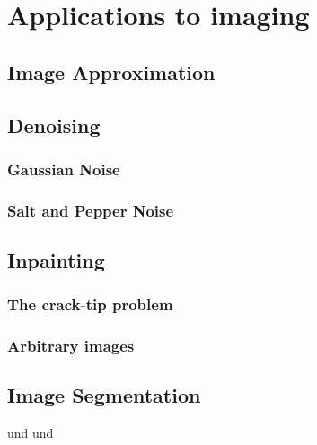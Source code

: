 \chapter{Applications to imaging} %
\label{cha:applications_to_imaging}

    \section{Image Approximation} %
    \label{sec:image_approximation}
    

    \section{Denoising} %
    \label{sec:denoising}
        \subsection{Gaussian Noise} %
        \label{sub:gaussian_noise}
            

        \subsection{Salt and Pepper Noise} %
        \label{sub:salt_and_pepper_noise}
            

    \section{Inpainting} %
    \label{sec:inpainting}
        \subsection{The crack-tip problem} %
        \label{sub:the_crack_tip_problem}
            
        \subsection{Arbitrary images} %
        \label{sub:arbitrary_images}
        

    \section{Image Segmentation} %
    \label{sec:image_segmentation}
        \cite{Pock-et-al-iccv09} und \cite{Cremers-Kolev-pami11} und \cite{Chambolle-et-al-10} \cite{strekalovskiy-et-al-siims14} \cite{dykstra-et-al-aors14} \cite{kelvey-ajp}
    
